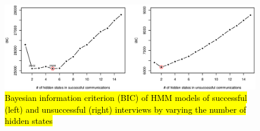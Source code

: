 \begin{figure}
\centering
\includegraphics[width=1.0\textwidth]{figures/bic-vs-hidden-states.eps}
\caption{\hl{Bayesian information criterion (BIC) of HMM models of successful (left) and unsuccessful (right) interviews by varying the number of hidden states}}
\label{fig:bic}
\end{figure}


